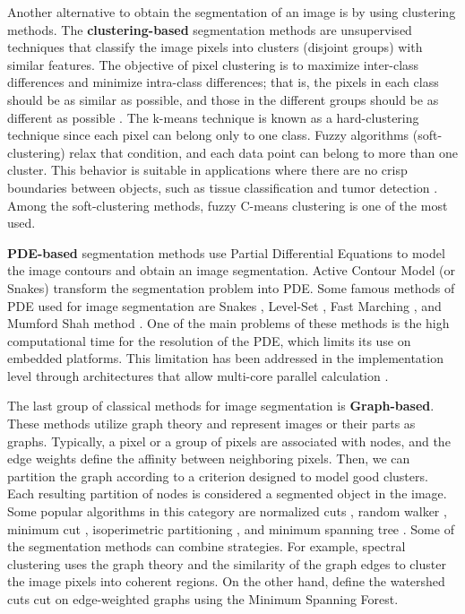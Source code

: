 Another alternative to obtain the segmentation of an image is by using clustering methods. The \textbf{clustering-based} segmentation methods are unsupervised techniques that classify the image pixels into clusters (disjoint groups) with similar features. The objective of pixel clustering is to maximize inter-class differences and minimize intra-class differences; that is, the pixels in each class should be as similar as possible, and those in the different groups should be as different as possible \citep{Steinley:BJMSP:2006}. The k-means technique is known as a hard-clustering technique since each pixel can belong only to one class. Fuzzy algorithms (soft-clustering) relax that condition, and each data point can belong to more than one cluster. This behavior is suitable in applications where there are no crisp boundaries between objects, such as tissue classification \citep{Caldairou.Passat.ea:PR:2011} and tumor detection \citep{Preetha.Suresh:CCT:2014}. Among the soft-clustering methods, fuzzy C-means clustering \citep{Dunn:JC:1973} is one of the most used.

\textbf{PDE-based} segmentation methods use Partial Differential Equations to model the image contours and obtain an image segmentation.  Active Contour Model (or Snakes) transform the segmentation problem into
PDE. Some famous methods of PDE used for image
segmentation are Snakes \citep{Kass.Witkin.ea:JCV:1988}, Level-Set \citep{Osher.Sethian:JCP:1988}, Fast Marching \citep{Forcadel.LeGuyader.ea:NA:2008}, and Mumford Shah method \citep{Mumford.Shah:CPAM:1989}. One of the main problems of these methods is the high computational time for the resolution of the PDE, which limits its use on embedded platforms. This limitation has been addressed in the implementation level through architectures that allow multi-core parallel calculation \citep{Dejnozkova.Dokladal:ICVIE:2003, Dejnozkova.Dokladal:ICASSP:2004}.

The last group of classical methods for image segmentation is \textbf{Graph-based}. These methods utilize graph theory and represent images or their parts as graphs.  Typically, a pixel or a group of pixels are associated with nodes, and the edge weights define the affinity between neighboring pixels. Then, we can partition the graph according to a criterion designed to model good clusters. Each resulting partition of nodes is considered a segmented object in the image. Some popular algorithms in this category are normalized cuts \citep{JianboShi.Malik:PAMI:2000}, random walker \citep{Grady:PAMI:2006}, minimum cut \citep{Wu.Leahy:PAMI:1993}, isoperimetric partitioning \citep{Grady.Schwartz:PAMI:2006}, and minimum spanning tree \citep{Zahn:TC:1971}. Some of the segmentation methods can combine strategies. For example, spectral clustering \citep{Ng.Jordan.ea:NIPS:2001} uses the graph theory and the similarity of the graph edges to cluster the image pixels into coherent regions. On the other hand, \citep{Cousty.Bertrand.ea:PAMI:2009} define the watershed cuts cut on edge-weighted graphs using the Minimum Spanning Forest.

